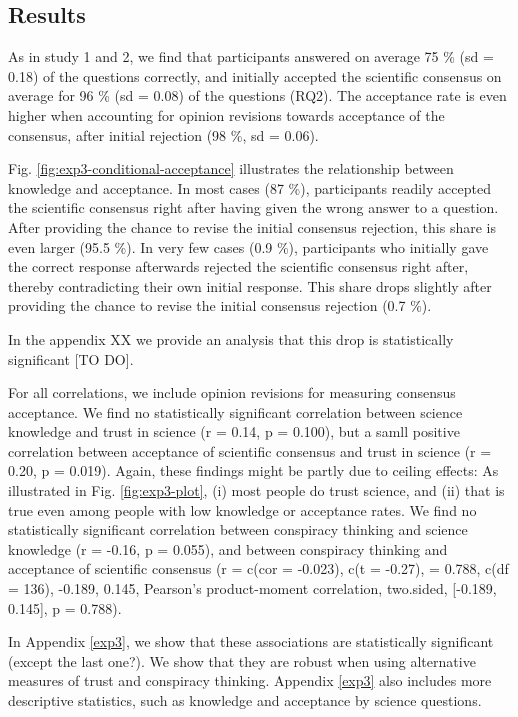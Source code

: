 \documentclass[
  doc,floatsintext]{apa6}
\begin{document}
\subsection{Results}\label{results-2}

As in study 1 and 2, we find that participants answered on average 75 \% (sd = 0.18) of the questions correctly, and initially accepted the scientific consensus on average for 96 \% (sd = 0.08) of the questions (RQ2). The acceptance rate is even higher when accounting for opinion revisions towards acceptance of the consensus, after initial rejection (98 \%, sd = 0.06).

Fig. \ref{fig:exp3-conditional-acceptance} illustrates the relationship between knowledge and acceptance. In most cases (87 \%), participants readily accepted the scientific consensus right after having given the wrong answer to a question. After providing the chance to revise the initial consensus rejection, this share is even larger (95.5 \%). In very few cases (0.9 \%), participants who initially gave the correct response afterwards rejected the scientific consensus right after, thereby contradicting their own initial response. This share drops slightly after providing the chance to revise the initial consensus rejection (0.7 \%).

In the appendix XX we provide an analysis that this drop is statistically significant {[}TO DO{]}.

For all correlations, we include opinion revisions for measuring consensus acceptance. We find no statistically significant correlation between science knowledge and trust in science (r = 0.14, p = 0.100), but a samll positive correlation between acceptance of scientific consensus and trust in science (r = 0.20, p = 0.019). Again, these findings might be partly due to ceiling effects: As illustrated in Fig. \ref{fig:exp3-plot}, (i) most people do trust science, and (ii) that is true even among people with low knowledge or acceptance rates. We find no statistically significant correlation between conspiracy thinking and science knowledge (r = -0.16, p = 0.055), and between conspiracy thinking and acceptance of scientific consensus (r = c(cor = -0.023), c(t = -0.27), = 0.788, c(df = 136), -0.189, 0.145, Pearson's product-moment correlation, two.sided, {[}-0.189, 0.145{]}, p = 0.788).

In Appendix \ref{exp3}, we show that these associations are statistically significant (except the last one?). We show that they are robust when using alternative measures of trust and conspiracy thinking. Appendix \ref{exp3} also includes more descriptive statistics, such as knowledge and acceptance by science questions.
\end{document}
